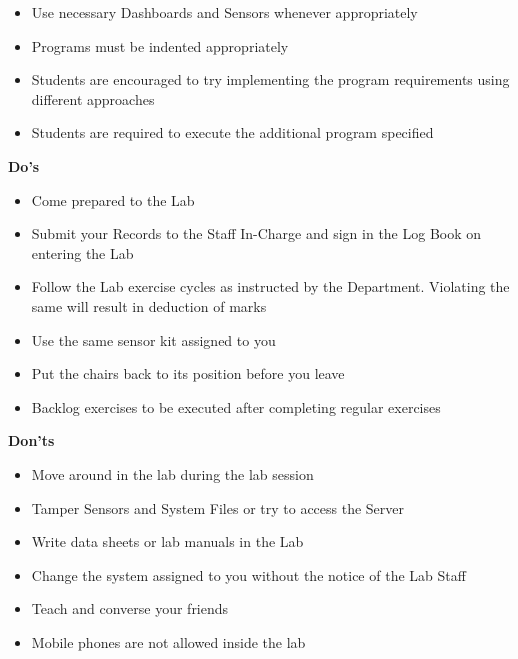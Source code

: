 \documentclass[12pt,a4paper]{article}
\begin{document}
\clearpage %
\begin{itemize}
\item Use necessary Dashboards and Sensors whenever appropriately
\item Programs must be indented appropriately
\item Students are encouraged to try implementing the program requirements using different approaches
\item Students are required to execute the additional program specified
\end{itemize}\vspace{0.3cm}
\textbf{Do’s}
\begin{itemize}
\item Come prepared to the Lab
\item Submit your Records to the Staff In-Charge and sign in the Log Book on entering the Lab
\item Follow the Lab exercise cycles as instructed by the Department. Violating the same will result in deduction of marks
\item Use the same sensor kit assigned to you
\item Put the chairs back to its position before you leave
\item Backlog exercises to be executed after completing regular exercises
\end{itemize}\vspace{0.3cm}
\textbf{Don’ts}
\begin{itemize}
\item Move around in the lab during the lab session
\item Tamper Sensors and System Files or try to access the Server
\item Write data sheets or lab manuals in the Lab
\item Change the system assigned to you without the notice of the Lab Staff
\item Teach and converse your friends
\item Mobile phones are not allowed inside the lab
\end{itemize}
\end{document}
